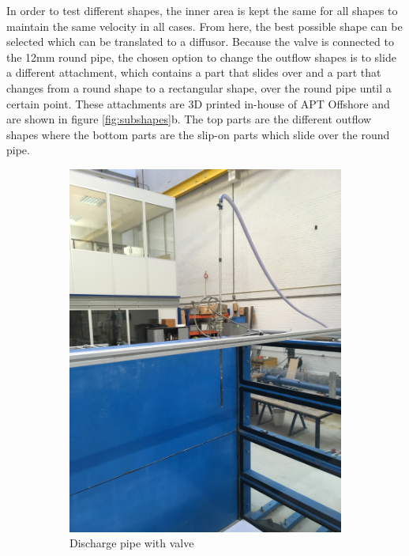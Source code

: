 \newpage
\noindent In order to test different shapes, the inner area is kept the same for all shapes to maintain the same velocity in all cases. From here, the best possible shape can be selected which can be translated to a diffusor. Because the valve is connected to the 12mm round pipe, the chosen option to change the outflow shapes is to slide a different attachment, which contains a part that slides over and a part that changes from a round shape to a rectangular shape,  over the round pipe until a certain point. These attachments are 3D printed in-house of APT Offshore and are shown in figure \ref{fig:subshapes}b. The top parts are the different outflow shapes where the bottom parts are the slip-on parts which slide over the round pipe.


\begin{figure}[ht!]
\centering
\begin{subfigure}{.5\textwidth}
  \centering
  \includegraphics[width=.8\linewidth]{Images/Overflow_test.jpeg}
  \caption{Discharge pipe with valve}
\end{subfigure}%
\begin{subfigure}{.5\textwidth}
  \centering

\end{subfigure}
\end{figure}
